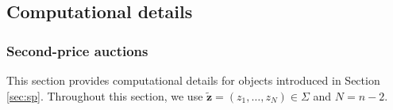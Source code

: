 




\subsection{Computational details}\label{sec:appendix-computation}

\subsubsection{Second-price auctions}\label{sec:appendix-computation1}


This section provides computational details for objects introduced in Section \ref{sec:sp}. Throughout this section, we use $\mathbf{\tilde{z}}=(z_{1},\dots ,z_{N})\in \Sigma $ and $N=n-2$.

